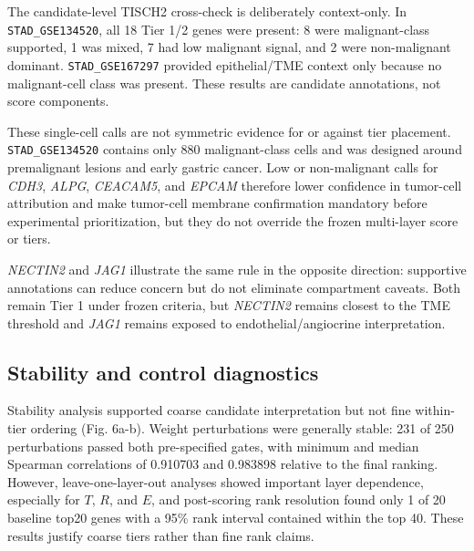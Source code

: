 \documentclass[preprint,12pt,authoryear]{elsarticle}
\begin{document}
The candidate-level TISCH2 cross-check is deliberately context-only. In \texttt{STAD\_\allowbreak{}GSE134520}, all 18 Tier 1/\allowbreak{}2 genes were present: 8 were malignant-class supported, 1 was mixed, 7 had low malignant signal, and 2 were non-malignant dominant. \texttt{STAD\_\allowbreak{}GSE167297} provided epithelial/\allowbreak{}TME context only because no malignant-cell class was present. These results are candidate annotations, not score components.

These single-cell calls are not symmetric evidence for or against tier placement. \texttt{STAD\_\allowbreak{}GSE134520} contains only 880 malignant-class cells and was designed around premalignant lesions and early gastric cancer. Low or non-malignant calls for \textit{CDH3}, \textit{ALPG}, \textit{CEACAM5}, and \textit{EPCAM} therefore lower confidence in tumor-cell attribution and make tumor-cell membrane confirmation mandatory before experimental prioritization, but they do not override the frozen multi-layer score or tiers.

\textit{NECTIN2} and \textit{JAG1} illustrate the same rule in the opposite direction: supportive annotations can reduce concern but do not eliminate compartment caveats. Both remain Tier 1 under frozen criteria, but \textit{NECTIN2} remains closest to the TME threshold and \textit{JAG1} remains exposed to endothelial/\allowbreak{}angiocrine interpretation.

\subsection{Stability and control diagnostics}

Stability analysis supported coarse candidate interpretation but not fine within-tier ordering (Fig. 6a-b). Weight perturbations were generally stable: 231 of 250 perturbations passed both pre-specified gates, with minimum and median Spearman correlations of 0.910703 and 0.983898 relative to the final ranking. However, leave-one-layer-out analyses showed important layer dependence, especially for $T$, $R$, and $E$, and post-scoring rank resolution found only 1 of 20 baseline top20 genes with a 95\% rank interval contained within the top 40. These results justify coarse tiers rather than fine rank claims.
\end{document}
